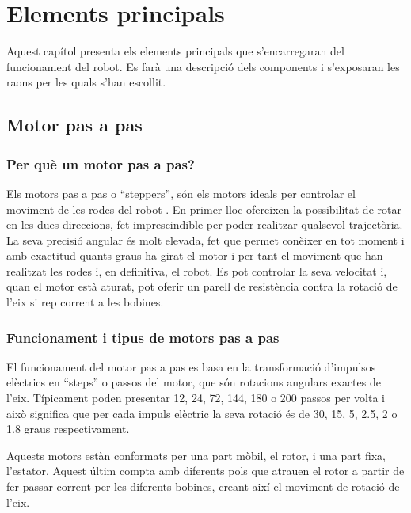 \setlength\topmargin{8mm}
\onehalfspacing
\chapter{Elements principals} %

\label{Chapter3} %


Aquest capítol presenta els elements principals que s'encarregaran del funcionament del robot. Es farà una descripció dels components i s'exposaran les raons per les quals s'han escollit.   

\section{Motor pas a pas}
\subsection{Per què un motor pas a pas?}

Els motors pas a pas o “steppers”, són els motors ideals per controlar el moviment de les rodes del robot \cite{billschweber2015}. En primer lloc ofereixen la possibilitat de rotar en les dues direccions, fet imprescindible per poder realitzar qualsevol trajectòria. La seva precisió angular és molt elevada, fet que permet conèixer en tot moment i amb exactitud quants graus ha girat el motor i per tant el moviment que han realitzat les rodes i, en definitiva, el robot. Es pot controlar la seva velocitat i, quan el motor està aturat, pot oferir un parell de resistència contra la rotació de l'eix si rep corrent a les bobines. 


\subsection{Funcionament i tipus de motors pas a pas}
El funcionament del motor pas a pas es basa en la transformació d'impulsos elèctrics en “steps” o passos del motor, que són rotacions angulars exactes de l'eix. Típicament poden presentar 12, 24, 72, 144, 180 o 200 passos per volta i això significa que per cada impuls elèctric la seva rotació és de 30, 15, 5, 2.5, 2 o 1.8 graus respectivament. 

Aquests motors estàn conformats per una part mòbil, el rotor, i una part fixa, l'estator. Aquest últim compta amb diferents pols que atrauen el rotor a partir de fer passar corrent per les diferents bobines, creant així el moviment de rotació de l'eix.

